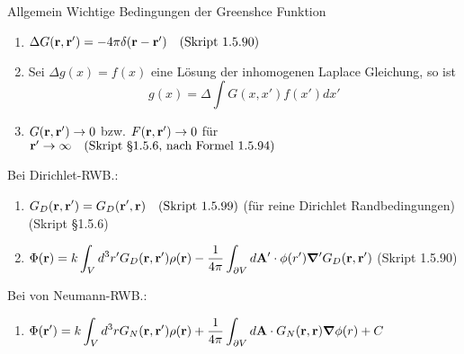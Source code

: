 \documentclass{scrartcl}
\newcommand{\ds}{\displaystyle}
\newcommand{\smref}[1]{\quad\text{(Skript #1)}}
\begin{document}
\begin{enumerate}
          Allgemein Wichtige Bedingungen der Greenshce Funktion
          \begin{center}
            \begin{enumerate}
              \item $\Delta G(\vb r, \vb r') = -4\pi\delta(\vb r -\vb r')
                \smref{1.5.90}$
              \item Sei $\Delta g(x) = f(x)$ eine Lösung der inhomogenen  
                Laplace Gleichung, so ist 
                $$ g(x)=\Delta\int G(x,x')f(x')dx'$$
              \item $G(\vb r, \vb r') \to 0$ bzw. $F(\vb r, \vb r')\to 0$ 
                für $\vb r'\to\infty
                \smref{§1.5.6, nach Formel 1.5.94}$
            \end{enumerate}
          \end{center}
          Bei Dirichlet-RWB.:
          \begin{center}
          \begin{enumerate}
            \item $\ds G_D(\vb r, \vb r')= G_D(\vb r', \vb r)
              \smref{1.5.99}$ 
            (für reine Dirichlet Randbedingungen) (Skript §1.5.6)\\
          \item $\ds \Phi(\vb r)=k\int_V d^3r' G_D(\vb r, \vb r')\rho(\vb r)
             -\frac{1}{4\pi}\int_{\partial V}d\vb A'\cdot\phi(r')
             \grad' G_D(\vb r, \vb r')$ (Skript 1.5.90)\\
          \end{enumerate}
          \end{center}
          Bei von Neumann-RWB.:
          \begin{enumerate}
            \item $\ds \Phi(\vb r')=
              k\int_V d^3r G_N(\vb r,\vb r')\rho(\vb r)
              +\frac{1}{4\pi} \int_{\partial V} d\vb A \cdot 
              G_N(\vb r,\vb r)\grad\phi(r) + C$
          \end{enumerate}
  \end{enumerate}
  \newpage
\end{document}
